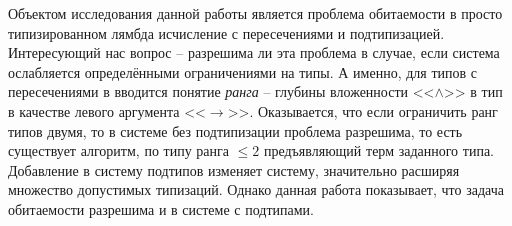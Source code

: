 \documentclass[../main.tex]{subfiles}
\begin{document}
Объектом исследования данной работы является проблема обитаемости в просто типизированном лямбда исчисление с пересечениями и подтипизацией. Интересующий нас вопрос -- разрешима ли эта проблема в случае, если система ослабляется определёнными ограничениями на типы. А именно, для типов с пересечениями в \cite{leivant_1983} вводится понятие {\it ранга} -- глубины вложенности <<$\wedge$>> в тип в качестве левого аргумента <<$\to$>>. Оказывается, что если ограничить ранг типов двумя, то в системе без подтипизации проблема разрешима, то есть существует алгоритм, по типу ранга $\leqslant 2$ предъявляющий терм заданного типа. Добавление в систему подтипов изменяет систему, значительно расширяя множество допустимых типизаций. Однако данная работа показывает, что задача обитаемости разрешима и в системе с подтипами. 
\end{document}
